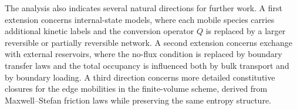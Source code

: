 \documentclass{article}
\begin{document}
The analysis also indicates several natural directions for further work.
A first extension concerns internal-state models, where each mobile
species carries additional kinetic labels and the conversion operator $Q$
is replaced by a larger reversible or partially reversible network. A
second extension concerns exchange with external reservoirs, where the
no-flux condition is replaced by boundary transfer laws and the total
occupancy is influenced both by bulk transport and by boundary loading.
A third direction concerns more detailed constitutive closures for the
edge mobilities in the finite-volume scheme, derived from Maxwell--Stefan
friction laws while preserving the same entropy structure.



\end{document}
